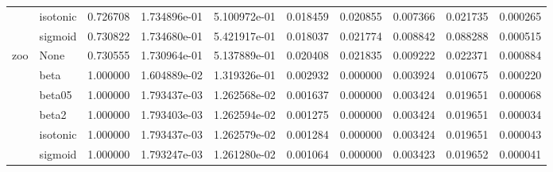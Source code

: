 \begin{tabular}{llrrrrrrrr}
        & isotonic &  0.726708 &  1.734896e-01 &  5.100972e-01 &   0.018459 &  0.020855 &  0.007366 &  0.021735 &  0.000265 \\
        & sigmoid &  0.730822 &  1.734680e-01 &  5.421917e-01 &   0.018037 &  0.021774 &  0.008842 &  0.088288 &  0.000515 \\
zoo & None &  0.730555 &  1.730964e-01 &  5.137889e-01 &   0.020408 &  0.021835 &  0.009222 &  0.022371 &  0.000884 \\
        & beta &  1.000000 &  1.604889e-02 &  1.319326e-01 &   0.002932 &  0.000000 &  0.003924 &  0.010675 &  0.000220 \\
        & beta05 &  1.000000 &  1.793437e-03 &  1.262568e-02 &   0.001637 &  0.000000 &  0.003424 &  0.019651 &  0.000068 \\
        & beta2 &  1.000000 &  1.793403e-03 &  1.262594e-02 &   0.001275 &  0.000000 &  0.003424 &  0.019651 &  0.000034 \\
        & isotonic &  1.000000 &  1.793437e-03 &  1.262579e-02 &   0.001284 &  0.000000 &  0.003424 &  0.019651 &  0.000043 \\
        & sigmoid &  1.000000 &  1.793247e-03 &  1.261280e-02 &   0.001064 &  0.000000 &  0.003423 &  0.019652 &  0.000041 \\
\bottomrule
\end{tabular}
